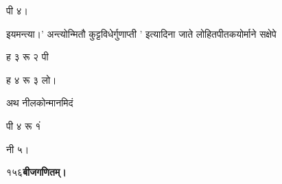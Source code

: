 \documentclass[11pt, openany]{book}
\begin{document}
\begin{sloppypar}
\begin{center}
\hspace{0.5in}पी ४।
\end{center}

\hangindent=0.2in इयमन्त्या।' अन्त्योन्मितौ कुट्टविधेर्गुणाप्ती ' इत्यादिना जाते लोहितपीतकयोर्माने सक्षेपे
\begin{center}
 ह ३ रू २ पी

 ह ४ रू ३ लो।
\end{center}

\hangindent=0.2in अथ नीलकोन्मानमिदं
\begin{center}
पी ४ रू १ं

\hspace{0.5in}नी ५।
\end{center}
\end{sloppypar}
\thispagestyle{empty}
\newpage

\onehalfspacing
१५६\hspace{2in}\textbf{बीजगणितम्।} 

\vspace{5mm}
\end{document}
